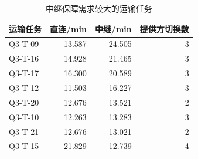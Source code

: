 \begin{table}[htbp]\centering\small
\caption{中继保障需求较大的运输任务}\label{tab:rev_q3_comm_tasks}
\begin{tabular}{lrrr}\toprule
运输任务 & 直连/min & 中继/min & 提供方切换数\\\midrule
Q3-T-09 & 13.587 & 24.505 & 3\\
Q3-T-16 & 14.928 & 21.465 & 3\\
Q3-T-17 & 16.300 & 20.589 & 3\\
Q3-T-12 & 11.503 & 16.227 & 3\\
Q3-T-20 & 12.676 & 13.521 & 2\\
Q3-T-10 & 12.263 & 13.283 & 3\\
Q3-T-21 & 12.676 & 13.021 & 2\\
Q3-T-15 & 21.829 & 12.739 & 4\\
\bottomrule\end{tabular}
\end{table}

